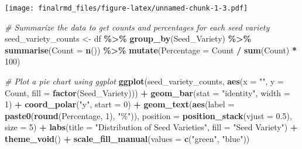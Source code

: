 \documentclass[
]{article}
\newenvironment{Shaded}{\begin{snugshade}}{\end{snugshade}}
\newcommand{\AttributeTok}[1]{\textcolor[rgb]{0.13,0.29,0.53}{#1}}
\newcommand{\CommentTok}[1]{\textcolor[rgb]{0.56,0.35,0.01}{\textit{#1}}}
\newcommand{\DecValTok}[1]{\textcolor[rgb]{0.00,0.00,0.81}{#1}}
\newcommand{\FloatTok}[1]{\textcolor[rgb]{0.00,0.00,0.81}{#1}}
\newcommand{\FunctionTok}[1]{\textcolor[rgb]{0.13,0.29,0.53}{\textbf{#1}}}
\newcommand{\NormalTok}[1]{#1}
\newcommand{\OtherTok}[1]{\textcolor[rgb]{0.56,0.35,0.01}{#1}}
\newcommand{\SpecialCharTok}[1]{\textcolor[rgb]{0.81,0.36,0.00}{\textbf{#1}}}
\newcommand{\StringTok}[1]{\textcolor[rgb]{0.31,0.60,0.02}{#1}}
\begin{document}
\begin{Shaded}
\end{Shaded}

\texttt{[image: finalrmd\_files/figure-latex/unnamed-chunk-1-3.pdf]}

\begin{Shaded}
\begin{Highlighting}[]
\CommentTok{\# Summarize the data to get counts and percentages for each seed variety}
\NormalTok{seed\_variety\_counts }\OtherTok{\textless{}{-}}\NormalTok{ df }\SpecialCharTok{\%\textgreater{}\%}
  \FunctionTok{group\_by}\NormalTok{(Seed\_Variety) }\SpecialCharTok{\%\textgreater{}\%}
  \FunctionTok{summarise}\NormalTok{(}\AttributeTok{Count =} \FunctionTok{n}\NormalTok{()) }\SpecialCharTok{\%\textgreater{}\%}
  \FunctionTok{mutate}\NormalTok{(}\AttributeTok{Percentage =}\NormalTok{ Count }\SpecialCharTok{/} \FunctionTok{sum}\NormalTok{(Count) }\SpecialCharTok{*} \DecValTok{100}\NormalTok{)}

\CommentTok{\# Plot a pie chart using ggplot}
\FunctionTok{ggplot}\NormalTok{(seed\_variety\_counts, }\FunctionTok{aes}\NormalTok{(}\AttributeTok{x =} \StringTok{""}\NormalTok{, }\AttributeTok{y =}\NormalTok{ Count, }\AttributeTok{fill =} \FunctionTok{factor}\NormalTok{(Seed\_Variety))) }\SpecialCharTok{+}
  \FunctionTok{geom\_bar}\NormalTok{(}\AttributeTok{stat =} \StringTok{"identity"}\NormalTok{, }\AttributeTok{width =} \DecValTok{1}\NormalTok{) }\SpecialCharTok{+}
  \FunctionTok{coord\_polar}\NormalTok{(}\StringTok{"y"}\NormalTok{, }\AttributeTok{start =} \DecValTok{0}\NormalTok{) }\SpecialCharTok{+}
  \FunctionTok{geom\_text}\NormalTok{(}\FunctionTok{aes}\NormalTok{(}\AttributeTok{label =} \FunctionTok{paste0}\NormalTok{(}\FunctionTok{round}\NormalTok{(Percentage, }\DecValTok{1}\NormalTok{), }\StringTok{"\%"}\NormalTok{)), }
            \AttributeTok{position =} \FunctionTok{position\_stack}\NormalTok{(}\AttributeTok{vjust =} \FloatTok{0.5}\NormalTok{), }\AttributeTok{size =} \DecValTok{5}\NormalTok{) }\SpecialCharTok{+}
  \FunctionTok{labs}\NormalTok{(}\AttributeTok{title =} \StringTok{"Distribution of Seed Varieties"}\NormalTok{, }\AttributeTok{fill =} \StringTok{"Seed Variety"}\NormalTok{) }\SpecialCharTok{+}
  \FunctionTok{theme\_void}\NormalTok{() }\SpecialCharTok{+}
  \FunctionTok{scale\_fill\_manual}\NormalTok{(}\AttributeTok{values =} \FunctionTok{c}\NormalTok{(}\StringTok{"green"}\NormalTok{, }\StringTok{"blue"}\NormalTok{))}
\end{Highlighting}
\end{Shaded}
\end{document}

